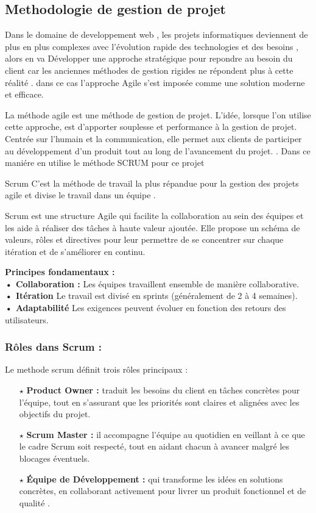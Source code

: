 \subsection{Methodologie de gestion de projet }
Dans le domaine de developpement web , les projets informatiques deviennent de plus en plus complexes avec l’évolution rapide des technologies et des besoins , alors en va Développer une approche stratégique pour repondre au besoin du client car les anciennes méthodes de gestion rigides ne répondent plus à cette réalité . dans ce cas l’approche Agile s’est imposée comme une solution moderne et efficace.

La méthode agile est une méthode de gestion de projet. L’idée, lorsque l’on utilise cette approche, est d’apporter souplesse et performance à la gestion de projet. Centrée sur l’humain et la communication, elle permet aux clients de participer au développement d’un produit tout au long de l’avancement du projet.\cite{ref2} .
Dans ce maniére en utilise le méthode SCRUM pour ce projet 

Scrum C'est la méthode de travail la plus répandue pour la gestion des projets agile et divise le travail dans un équipe .

Scrum est une structure Agile qui facilite la collaboration au sein des équipes et les aide à réaliser des tâches à haute valeur ajoutée. Elle propose un schéma de valeurs, rôles et directives pour leur permettre de se concentrer sur chaque itération et de s’améliorer en continu.\cite{ref3}

\textbf{Principes fondamentaux : }\\
\textbf{•	Collaboration :   } Les équipes travaillent ensemble de manière collaborative. \\
\textbf{•	Itération } Le travail est divisé en sprints (généralement de 2 à 4 semaines). \\
\textbf{•	Adaptabilité }Les exigences peuvent évoluer en fonction des retours des utilisateurs.
\subsubsection{Rôles dans Scrum :}
Le methode scrum définit trois rôles principaux :

 \begin{itemize}
    \item[$\star$] \textbf{Product Owner : }traduit les besoins du client en tâches concrètes pour l’équipe, tout en s’assurant que les priorités sont claires et alignées avec les objectifs du projet. 
 \item[$\star$]\textbf{Scrum Master : }il accompagne l’équipe au quotidien en veillant à ce que le cadre Scrum soit respecté, tout en aidant chacun à avancer malgré les blocages éventuels.
 \item[$\star$]\textbf{Équipe de Développement : } qui transforme les idées en solutions concrètes, en collaborant activement pour livrer un produit fonctionnel et de qualité . 
\end{itemize}
